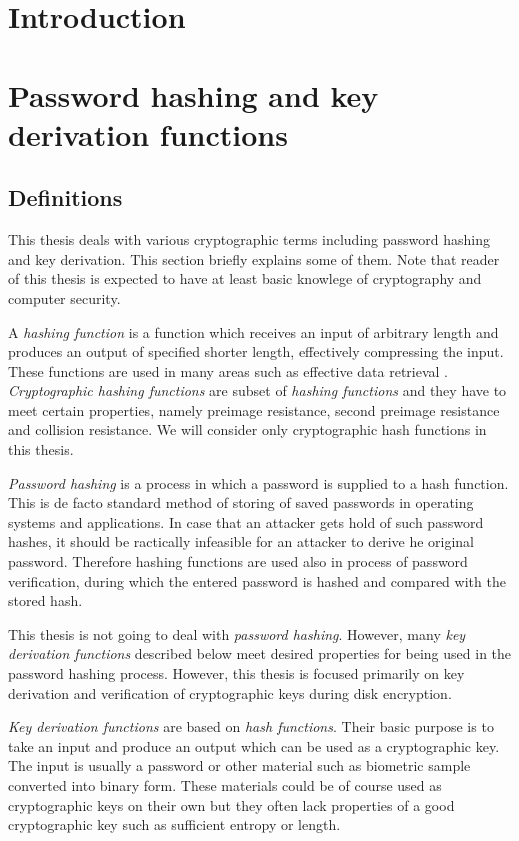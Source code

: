 \documentclass[nolof]{fithesis3}
\begin{document}
\tableofcontents
\chapter{Introduction}

\chapter{Password hashing and key derivation functions}

\section{Definitions}
\label{definitions}
This thesis deals with various cryptographic terms including password hashing and key derivation. This section briefly explains some of them. Note that reader of this thesis is expected to have at least basic knowlege of cryptography and computer security.

A \emph{hashing function} is a function which receives an input of arbitrary length and produces an output of specified shorter length, effectively compressing the input. These functions are used in many areas such as effective data retrieval \parencite{itmc14}. \emph{Cryptographic hashing functions} are subset of \emph{hashing functions} and they have to meet certain properties, namely preimage resistance, second preimage resistance and collision resistance. We will consider only cryptographic hash functions in this thesis.

\emph{Password hashing} is a process in which a password is supplied to a hash function. This is de facto standard method of storing of saved passwords in operating systems and applications. In case that an attacker gets hold of such password hashes, it should be ractically infeasible for an attacker to derive he original password. Therefore hashing functions are used also in process of password verification, during which the entered password is hashed and compared with the stored hash.

This thesis is not going to deal with \emph{password hashing}. However, many \emph{key derivation functions} described below meet desired properties for being used in the password hashing process. However, this thesis is focused primarily on key derivation and verification of cryptographic keys during disk encryption.

\emph{Key derivation functions} are based on \emph{hash functions}. Their basic purpose is to take an input and produce an output which can be used as a cryptographic key. The input is usually a password or other material such as biometric sample converted into binary form. These materials could be of course used as cryptographic keys on their own but they often lack properties of a good cryptographic key such as sufficient entropy or length. 
\end{document}
